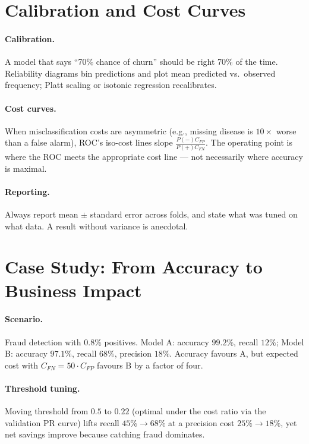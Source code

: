 \section{Calibration and Cost Curves}
\label{sec:calibration}
\paragraph{Calibration.} A model that says ``70\% chance of churn'' should be right 70\% of the time. Reliability diagrams bin predictions and plot mean predicted vs.\ observed frequency; Platt scaling or isotonic regression recalibrates.

\paragraph{Cost curves.} When misclassification costs are asymmetric (e.g., missing disease is $10\times$ worse than a false alarm), ROC's iso-cost lines slope $\frac{P(-)C_{FP}}{P(+)C_{FN}}$. The operating point is where the ROC meets the appropriate cost line --- not necessarily where accuracy is maximal.

\paragraph{Reporting.} Always report mean $\pm$ standard error across folds, and state what was tuned on what data. A result without variance is anecdotal.

\section{Case Study: From Accuracy to Business Impact}
\label{sec:business-impact}
\paragraph{Scenario.} Fraud detection with 0.8\% positives. Model A: accuracy $99.2\%$, recall $12\%$; Model B: accuracy $97.1\%$, recall $68\%$, precision $18\%$. Accuracy favours A, but expected cost with $C_{FN}=50\cdot C_{FP}$ favours B by a factor of four.

\paragraph{Threshold tuning.} Moving threshold from $0.5$ to $0.22$ (optimal under the cost ratio via the validation PR curve) lifts recall $45\%\to68\%$ at a precision cost $25\%\to18\%$, yet net savings improve because catching fraud dominates.

